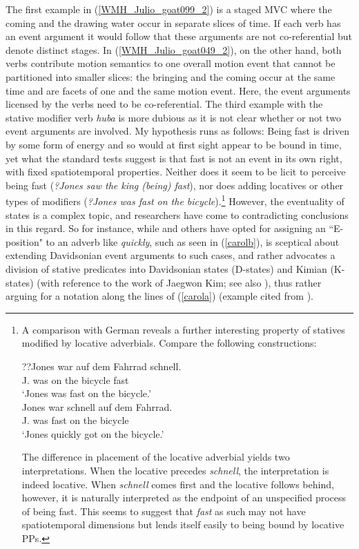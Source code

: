 The first example in (\ref{WMH_Julio_goat099_2}) is a staged MVC where the coming and the drawing water occur in separate slices of time. If each verb has an event argument it would follow that these arguments are not co-referential but denote distinct stages. In (\ref{WMH_Julio_goat049_2}), on the other hand, both verbs contribute motion semantics to one overall motion event that cannot be partitioned into smaller slices: the bringing and the coming occur at the same time and are facets of one and the same motion event. Here, the event arguments licensed by the verbs need to be co-referential. The third example with the stative modifier verb \textit{huba} is more dubious as it is not clear whether or not two event arguments are involved. My hypothesis runs as follows: Being fast is driven by some form of energy and so would at first sight appear to be bound in time, yet what the standard tests suggest is that fast is not an event in its own right, with fixed spatiotemporal properties. Neither does it seem to be licit to perceive being fast (\textit{?Jones saw the king (being) fast}), nor does adding locatives or other types of modifiers (\textit{?Jones was fast on the bicycle}).\footnote{A comparison with German reveals a further interesting property of statives modified by locative adverbials. Compare the following constructions:

\ea 
\ea
\gll ??Jones war auf dem Fahrrad schnell.\\
J. was on the bicycle fast \\
\glft `Jones was fast on the bicycle.'\\
\ex
\gll Jones war schnell auf dem Fahrrad.\\
J. was fast on the bicycle \\
\glft `Jones quickly got on the bicycle.'\\
\z
\z

The difference in placement of the locative adverbial yields two interpretations. When the locative precedes \textit{schnell}, the interpretation is indeed locative. When \textit{schnell} comes first and the locative follows behind, however, it is naturally interpreted as the endpoint of an unspecified process of being fast. This seems to suggest that \textit{fast} as such may not have spatiotemporal dimensions but lends itself easily to being bound by locative PPs.} However, the eventuality of states is a complex topic, and researchers have come to contradicting conclusions in this regard. So for instance, while \citet[355f.]{higginbotham2000events} and others have opted for assigning an ``E-position" to an adverb like \textit{quickly}, such as seen in (\ref{carolb}), \citet{maienborn2005limits} is sceptical about extending Davidsonian event arguments to such cases, and rather advocates a division of stative predicates into Davidsonian states (D-states) and Kimian (K-states) (with reference to the work of Jaegwon Kim; see also \citealt{engelberg2005kimian}), thus rather arguing for a notation along the lines of (\ref{carola}) (example cited from \citealt[312]{maienborn2005limits}).

